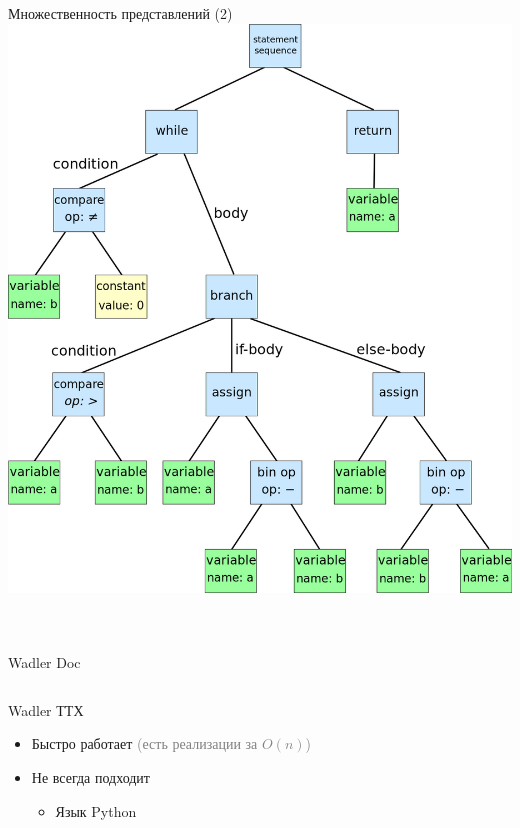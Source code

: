 \documentclass[sans]{beamer}
\begin{document}
\begin{frame}{Множественность представлений (2)}
  \centering
  \includegraphics[width = 0.2\linewidth]{images/ast.png}
  \begin{columns}
    \begin{column}{0.3\linewidth}
      \inputminted{c}{codes/ast1.c}
    \end{column}
    \begin{column}{0.5\linewidth}
      \inputminted{c}{codes/ast2.c}
    \end{column}
  \end{columns}
\end{frame}

\begin{frame}{Wadler Doc}
  \inputminted{hs}{codes/wadlerDoc.hs}
\end{frame}

\begin{frame}{Wadler ТТХ}
  \begin{itemize}
    \item Быстро работает \textcolor{gray}{(есть реализации за $O(n)$)}
    \item Не всегда подходит
    \begin{itemize}
      \item Язык Python
        \inputminted{py}{codes/wadlerSeq.py}
    \end{itemize}
  \end{itemize}
\end{frame}
\end{document}
